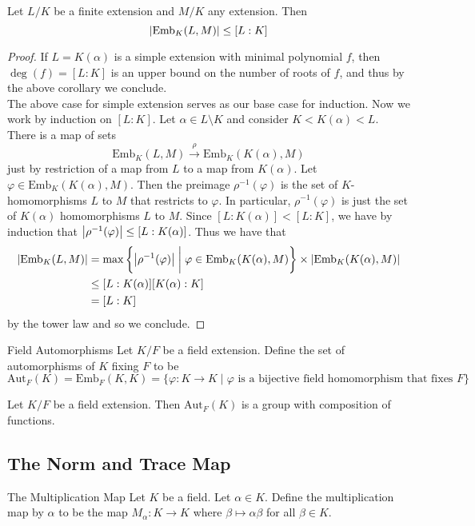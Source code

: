 \documentclass[a4paper]{article}
\begin{document}
\begin{thm}{}{} Let $L/K$ be a finite extension and $M/K$ any extension. Then $$\abs{\text{Emb}_K(L,M)}\leq[L:K]$$ 
\begin{proof}
If $L=K(\alpha)$ is a simple extension with minimal polynomial $f$, then $\deg(f)=[L:K]$ is an upper bound on the number of roots of $f$, and thus by the above corollary we conclude. \\

The above case for simple extension serves as our base case for induction. Now we work by induction on $[L:K]$. Let $\alpha\in L\setminus K$ and consider $K<K(\alpha)<L$. There is a map of sets $$\text{Emb}_K(L,M)\overset{\rho}{\to}\text{Emb}_K(K(\alpha),M)$$ just by restriction of a map from $L$ to a map from $K(\alpha)$. Let $\varphi\in\text{Emb}_K(K(\alpha),M)$. Then the preimage $\rho^{-1}(\varphi)$ is the set of $K$-homomorphisms $L$ to $M$ that restricts to $\varphi$. In particular, $\rho^{-1}(\varphi)$ is just the set of $K(\alpha)$ homomorphisms $L$ to $M$. Since $[L:K(\alpha)]<[L:K]$, we have by induction that $\abs{\rho^{-1}(\varphi)}\leq[L:K(\alpha)]$. Thus we have that 
\begin{align*}
\abs{\text{Emb}_K(L,M)}&=\max\left\{\abs{\rho^{-1}(\varphi)}\;\bigg{|}\;\varphi\in\text{Emb}_K(K(\alpha),M)\right\}\times\abs{\text{Emb}_K(K(\alpha),M)}\\
&\leq[L:K(\alpha)][K(\alpha):K]\\
&=[L:K]
\end{align*}
by the tower law and so we conclude. 
\end{proof}
\end{thm}

\begin{defn}{Field Automorphisms}{} Let $K/F$ be a field extension. Define the set of automorphisms of $K$ fixing $F$ to be $$\text{Aut}_F(K)=\text{Emb}_F(K,K)=\{\varphi:K\to K\;|\;\varphi\text{ is a bijective field homomorphism that fixes }F\}$$
\end{defn}

\begin{lmm}{}{} Let $K/F$ be a field extension. Then $\text{Aut}_F(K)$ is a group with composition of functions. 
\end{lmm}

\subsection{The Norm and Trace Map}
\begin{defn}{The Multiplication Map}{} Let $K$ be a field. Let $\alpha\in K$. Define the multiplication map by $\alpha$ to be the map $M_\alpha:K\to K$ where $\beta\mapsto\alpha\beta$ for all $\beta\in K$. 
\end{defn}
\end{document}
